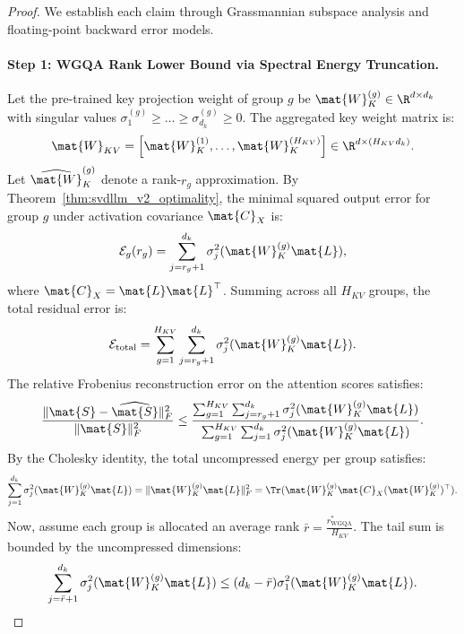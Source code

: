 \begin{proof}
We establish each claim through Grassmannian subspace analysis and floating-point backward error models.

\paragraph{Step 1: WGQA Rank Lower Bound via Spectral Energy Truncation.}
Let the pre-trained key projection weight of group $g$ be $\mat{W}_K^{(g)} \in \R^{d \times d_k}$ with singular values $\sigma_1^{(g)} \ge \dots \ge \sigma_{d_k}^{(g)} \ge 0$.
The aggregated key weight matrix is:
\begin{equation}
\mat{W}_{KV} = \left[ \mat{W}_K^{(1)}, \dots, \mat{W}_K^{(H_{KV})} \right] \in \R^{d \times (H_{KV} d_k)}.
\end{equation}
Let $\widehat{\mat{W}}_K^{(g)}$ denote a rank-$r_g$ approximation.
By Theorem~\ref{thm:svdllm_v2_optimality}, the minimal squared output error for group $g$ under activation covariance $\mat{C}_X$ is:
\begin{equation}
\mathcal{E}_g(r_g) = \sum_{j=r_g+1}^{d_k} \sigma_j^2(\mat{W}_K^{(g)} \mat{L}),
\end{equation}
where $\mat{C}_X = \mat{L}\mat{L}^\top$.
Summing across all $H_{KV}$ groups, the total residual error is:
\begin{equation}
\mathcal{E}_{\text{total}} = \sum_{g=1}^{H_{KV}} \sum_{j=r_g+1}^{d_k} \sigma_j^2(\mat{W}_K^{(g)} \mat{L}).
\end{equation}
The relative Frobenius reconstruction error on the attention scores satisfies:
\begin{equation}
\frac{\|\mat{S} - \widehat{\mat{S}}\|_F^2}{\|\mat{S}\|_F^2} \le \frac{\sum_{g=1}^{H_{KV}} \sum_{j=r_g+1}^{d_k} \sigma_j^2(\mat{W}_K^{(g)} \mat{L})}{\sum_{g=1}^{H_{KV}} \sum_{j=1}^{d_k} \sigma_j^2(\mat{W}_K^{(g)} \mat{L})}.
\end{equation}
By the Cholesky identity, the total uncompressed energy per group satisfies:
\begin{equation}
\sum_{j=1}^{d_k} \sigma_j^2(\mat{W}_K^{(g)} \mat{L}) = \|\mat{W}_K^{(g)} \mat{L}\|_F^2 = \Tr(\mat{W}_K^{(g)} \mat{C}_X (\mat{W}_K^{(g)})^\top).
\end{equation}
Now, assume each group is allocated an average rank $\bar{r} = \frac{r_{\text{WGQA}}^*}{H_{KV}}$.
The tail sum is bounded by the uncompressed dimensions:
\begin{equation}
\sum_{j=\bar{r}+1}^{d_k} \sigma_j^2(\mat{W}_K^{(g)} \mat{L}) \le (d_k - \bar{r}) \sigma_1^2(\mat{W}_K^{(g)} \mat{L}).

\end{equation}
\end{proof}
